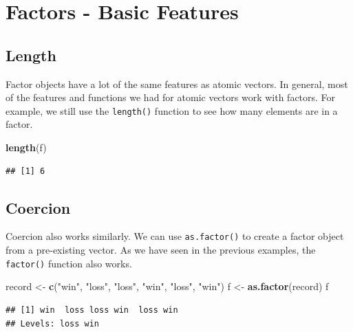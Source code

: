 \documentclass[
]{book}
\newenvironment{Shaded}{\begin{snugshade}}{\end{snugshade}}
\newcommand{\KeywordTok}[1]{\textcolor[rgb]{0.13,0.29,0.53}{\textbf{#1}}}
\newcommand{\NormalTok}[1]{#1}
\newcommand{\StringTok}[1]{\textcolor[rgb]{0.31,0.60,0.02}{#1}}
\begin{document}
\hypertarget{factors---basic-features}{%
\section{Factors - Basic Features}\label{factors---basic-features}}

\hypertarget{length-1}{%
\subsection{Length}\label{length-1}}

Factor objects have a lot of the same features as atomic vectors. In general, most of the features and functions we had for atomic vectors work with factors. For example, we still use the \texttt{length()} function to see how many elements are in a factor.

\begin{Shaded}
\begin{Highlighting}[]
\KeywordTok{length}\NormalTok{(f)}
\end{Highlighting}
\end{Shaded}

\begin{verbatim}
## [1] 6
\end{verbatim}

\hypertarget{coercion-1}{%
\subsection{Coercion}\label{coercion-1}}

Coercion also works similarly. We can use \texttt{as.factor()} to create a factor object from a pre-existing vector. As we have seen in the previous examples, the \texttt{factor()} function also works.

\begin{Shaded}
\begin{Highlighting}[]
\NormalTok{record <-}\StringTok{ }\KeywordTok{c}\NormalTok{(}\StringTok{"win"}\NormalTok{, }\StringTok{"loss"}\NormalTok{, }\StringTok{"loss"}\NormalTok{, }\StringTok{"win"}\NormalTok{, }\StringTok{"loss"}\NormalTok{, }\StringTok{"win"}\NormalTok{)}
\NormalTok{f <-}\StringTok{ }\KeywordTok{as.factor}\NormalTok{(record)}
\NormalTok{f}
\end{Highlighting}
\end{Shaded}

\begin{verbatim}
## [1] win  loss loss win  loss win 
## Levels: loss win
\end{verbatim}
\end{document}
